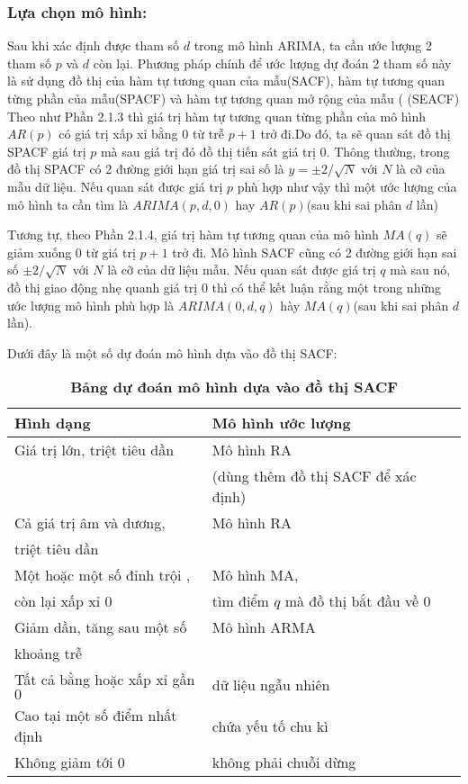 \documentclass[twoside,12pt]{Latex/Classes/PhDthesisPSnPDF}
\begin{document}
\subsubsection{Lựa chọn mô hình:}
Sau khi xác định được tham số $d$ trong mô hình ARIMA, ta cần ước lượng 2 tham số $p$ và $d$ còn lại. Phương pháp chính để ước lượng dự đoán 2 tham số này là sử dụng đồ thị của hàm tự tương quan của mẫu(SACF), hàm tự tương quan từng phần của mẫu(SPACF) và hàm tự tương quan mở rộng của mẫu (
(SEACF)
Theo như Phần 2.1.3 thì giá trị hàm tự tương quan từng phần của mô hình $AR(p)$ có giá trị xấp xỉ bằng $0$ từ trễ $p+1$ trở đi.Do đó, ta sẽ quan sát đồ thị SPACF giá trị $p$ mà sau giá trị đó đồ thị tiến sát giá trị $0$. Thông thường, trong đồ thị SPACF có 2 đường giới hạn giá trị sai số là $y = \pm2/\sqrt{N}$ với $N$ là cỡ của mẫu dữ liệu. Nếu quan sát được giá trị $p$ phù hợp như vậy thì một ước lượng của mô hình ta cần tìm là $ARIMA(p,d,0)$ hay $AR(p)$(sau khi sai phân $d$ lần)

Tương tự, theo Phần 2.1.4, giá trị hàm tự tương quan của mô hình $MA(q)$ sẽ giảm xuống $0$ từ giá trị $p+1$ trở đi. Mô hình SACF cũng có 2 đường giới hạn sai số $\pm2/\sqrt{N}$ với $N$ là cỡ của dữ liệu mẫu. Nếu quan sát được giá trị $q$ mà sau nó, đồ thị giao động nhẹ quanh giá trị 0 thì có thể kết luận rằng một trong những ước lượng mô hình phù hợp là $ARIMA(0,d,q)$ hày $MA(q)$(sau khi sai phân $d$ lần).

Dưới đây là một số dự đoán mô hình dựa vào đồ thị SACF:
\begin{table}[htdp]
\centering
\begin{tabular}{|l|l|l|} %
\hline
{\bf Hình dạng} & {\bf Mô hình ước lượng}  \\ 
\hline %

Giá trị lớn, triệt tiêu dần & Mô hình RA \\
$\qquad$&(dùng thêm đồ thị SACF để xác định)  \\ \hline
Cả giá trị âm và dương, &Mô hình RA\\ 
triệt tiêu dần & $\qquad$  \\\hline
Một hoặc một số đỉnh trội , & Mô hình MA,\\
còn lại xấp xỉ 0& tìm điểm $q$ mà đồ thị bắt đầu về 0 \\ \hline
Giảm dần, tăng sau một số  & Mô hình ARMA \\
khoảng trễ& $\qquad$ \\ \hline
Tất cả bằng hoặc xấp xỉ gần $0$ & dữ liệu ngẫu nhiên \\ \hline
Cao tại một số điểm nhất định & chứa yếu tố chu kì \\ \hline
Không giảm tới 0 & không phải chuỗi dừng \\ \hline
\end{tabular}
\caption[title of table]{\textbf{Bảng dự đoán mô hình dựa vào đồ thị SACF}}
\label{fcpq} %
\end{table}
\end{document}
